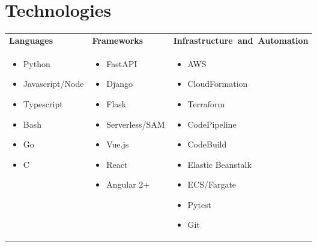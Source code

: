 \documentclass[letterpaper]{twentysecondcv} %
\begin{document}
\section{Technologies}

\begin{tabular}{ p{4cm} p{4cm} p{5cm}}
    \textbf{Languages} & \textbf{Frameworks} & \textbf{Infrastructure~and~Automation} \\
    
    \begin{itemize}
      \item Python 
      \item Javascript/Node
      \item Typescript 
      \item Bash 
      \item Go
      \item C 
    \end{itemize}  &
    \begin{itemize}
      \item FastAPI
      \item Django
      \item Flask 
      \item Serverless/SAM
      \item Vue.js 
      \item React 
      \item Angular 2+ 
    \end{itemize} &
    \begin{itemize}
      \item AWS 
      \item CloudFormation 
      \item Terraform
      \item CodePipeline
      \item CodeBuild
      \item Elastic Beanstalk
      \item ECS/Fargate
      \item Pytest
      \item Git 
    \end{itemize} \\
\end{tabular}

\vspace{-0.9cm}

\end{document}
